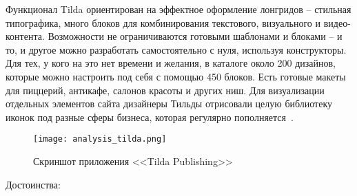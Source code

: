 Функционал Tilda ориентирован на эффектное оформление лонгридов -- стильная типографика, много блоков для комбинирования текстового, визуального и видео-контента. Возможности не ограничиваются готовыми шаблонами и блоками -- и то, и другое можно разработать самостоятельно с нуля, используя конструкторы. Для тех, у кого на это нет времени и желания, в каталоге около 200 дизайнов, которые можно настроить под себя с помощью 450 блоков. Есть готовые макеты для пиццерий, антикафе, салонов красоты и других ниш. Для визуализации отдельных элементов сайта дизайнеры Тильды отрисовали целую библиотеку иконок под разные сферы бизнеса, которая регулярно пополняется~\cite{cms_examples}.

\pagebreak

\begin{figure}
\centering
	\texttt{[image: analysis\_tilda.png]}
	\caption{Скриншот приложения <<Tilda Publishing>>}
	\label{sec:analysis:tilda}
\end{figure}

Достоинства:

